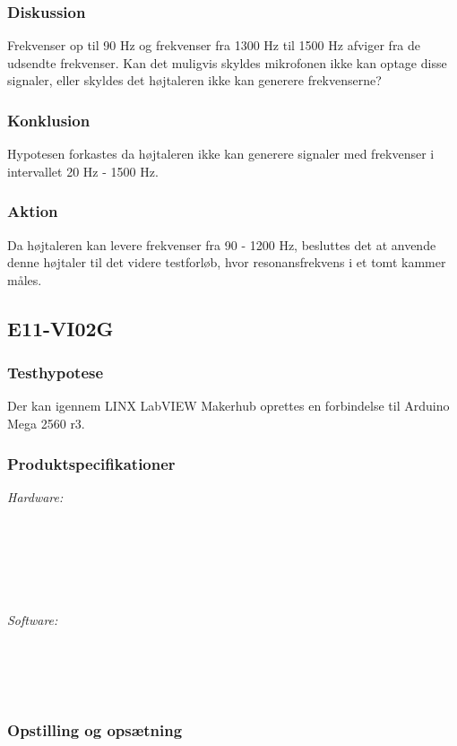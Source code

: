 		\subsubsection{Diskussion} 
		Frekvenser op til 90 Hz og frekvenser fra 1300 Hz til 1500 Hz afviger fra de udsendte frekvenser. Kan det muligvis skyldes mikrofonen ikke kan optage disse signaler, eller skyldes det højtaleren ikke kan generere frekvenserne? 
		\subsubsection{Konklusion}
	Hypotesen forkastes da højtaleren  ikke kan generere signaler med frekvenser i intervallet 20 Hz - 1500 Hz.
	    \subsubsection{Aktion}
	    	Da højtaleren kan levere frekvenser fra 90 - 1200 Hz, besluttes det at anvende denne højtaler til det videre testforløb, hvor resonansfrekvens i et tomt kammer måles. 
	    
\subsection{E11-VI02G}
\subsubsection{Testhypotese} 
Der kan igennem LINX LabVIEW Makerhub oprettes en forbindelse til Arduino Mega 2560 r3. 
\subsubsection{Produktspecifikationer}

\textit{Hardware:}\\
		\\
		\hojtalerkabel\\
		\pins\\
		\arduino\\
		\PC\\
		\usbkabel\\
	
		\textit{Software:}\\
		\labview\\
		\visa\\
		\vi\\
		\ardsw\


\subsubsection{Opstilling og opsætning}

